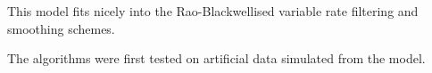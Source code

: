 \documentclass[journal]{IEEEtran}
\begin{document}
This model fits nicely into the Rao-Blackwellised variable rate filtering and smoothing schemes.

The algorithms were first tested on artificial data simulated from the model.




%
%



%
%
\end{document}

